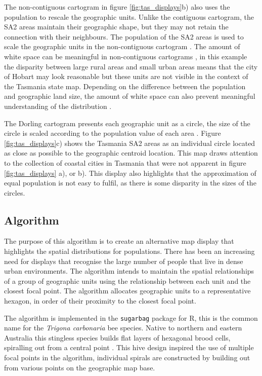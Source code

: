 The non-contiguous cartogram in figure \ref{fig:tas_displays}b) also
uses the population to rescale the geographic units. Unlike the
contiguous cartogram, the SA2 areas maintain their geographic shape, but
they may not retain the connection with their neighbours. The population
of the SA2 areas is used to scale the geographic units in the
non-contiguous cartogram \citep{NAC}. The amount of white space can be
meaningful in non-contiguous cartograms \citep{ECGC}, in this example
the disparity between large rural areas and small urban areas means that
the city of Hobart may look reasonable but these units are not visible
in the context of the Tasmania state map. Depending on the difference
between the population and geographic land size, the amount of white
space can also prevent meaningful understanding of the distribution
\citep{TVSSS}.

The Dorling cartogram presents each geographic unit as a circle, the
size of the circle is scaled according to the population value of each
area \citep{ACTUC}. Figure \ref{fig:tas_displays}c) shows the Tasmania
SA2 areas as an individual circle located as close as possible to the
geographic centroid location. This map draws attention to the collection
of coastal cities in Tasmania that were not apparent in figure
\ref{fig:tas_displays} a), or b). This display also highlights that the
approximation of equal population is not easy to fulfil, as there is
some disparity in the sizes of the circles.

\hypertarget{algorithm}{%
\subsection{Algorithm}\label{algorithm}}

The purpose of this algorithm is to create an alternative map display
that highlights the spatial distributions for populations. There has
been an increasing need for displays that recognise the large number of
people that live in dense urban environments. The algorithm intends to
maintain the spatial relationships of a group of geographic units using
the relationship between each unit and the closest focal point. The
algorithm allocates geographic units to a representative hexagon, in
order of their proximity to the closest focal point.

The algorithm is implemented in the \texttt{sugarbag} package for R,
this is the common name for the \emph{Trigona carbonaria} bee species.
Native to northern and eastern Australia this stingless species builds
flat layers of hexagonal brood cells, spiralling out from a central
point \citep{PH}. This hive design inspired the use of multiple focal
points in the algorithm, individual spirals are constructed by building
out from various points on the geographic map base.

